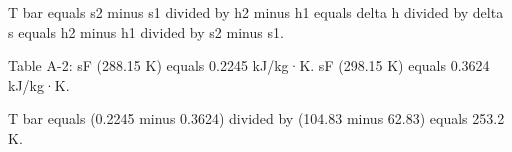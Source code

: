 T bar equals s2 minus s1 divided by h2 minus h1 equals delta h divided by delta s equals h2 minus h1 divided by s2 minus s1.  

Table A-2:  
sF (288.15 K) equals 0.2245 kJ/kg·K.  
sF (298.15 K) equals 0.3624 kJ/kg·K.  

T bar equals (0.2245 minus 0.3624) divided by (104.83 minus 62.83) equals 253.2 K.